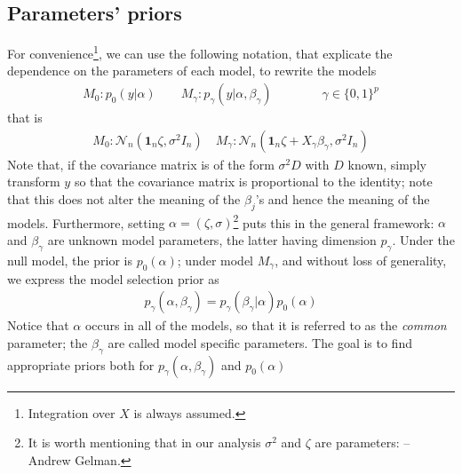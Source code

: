 \documentclass[11 pt]{article}
\begin{document}
\begin{multicols}{2}

\section{Parameters' priors}
For convenience\footnote{Integration over $X$ is always assumed.}, we can use the following notation, that explicate the dependence on the parameters of each model, to rewrite the models 
\begin{align*}
M_0: p_0(y|\alpha) \qquad M_\gamma: p_\gamma(y| \alpha, \beta_\gamma) \qquad \qquad \gamma \in \{0,1\}^p
\end{align*}
that is
\begin{align*}
M_0: \mathcal{N}_n\left(\mathbf{1}_n \zeta, \sigma^2I_n\right) \quad M_\gamma: \mathcal{N}_n \left(\mathbf{1}_n \zeta + X_\gamma\beta_\gamma, \sigma^2I_n \right)
\end{align*}
Note that, if the covariance matrix is of the form $\sigma^2 D$ with $D$ known, simply transform $y$ so that the covariance matrix is proportional to the identity; note that this does not alter the meaning of the $\beta_j$’s and hence the meaning of the models. Furthermore, setting $\alpha = (\zeta,\sigma)$\footnote{It is worth mentioning that in our analysis $\sigma^2$ and $\zeta$ are  parameters:  -- Andrew Gelman.} puts this in the general framework: $\alpha$ and $\beta_\gamma$ are unknown model parameters, the latter having dimension $p_\gamma$.  Under the null model, the prior is $p_0(\alpha)$; under model $M_\gamma$, and without loss of generality, we express the model selection prior as
\begin{align*}
    p_\gamma(\alpha,\beta_\gamma) = p_\gamma(\beta_\gamma|\alpha) p_0(\alpha)
\end{align*}
Notice that $\alpha$ occurs in all of the models, so that it is referred to as the \textit{common} parameter; the $\beta_\gamma$ are called model specific parameters. The goal is to find appropriate priors both for $p_\gamma(\alpha, \beta_\gamma)$ and $p_0(\alpha)$


\end{multicols}
\end{document}
